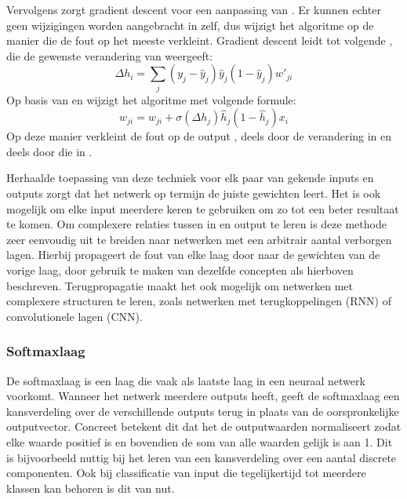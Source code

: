 Vervolgens zorgt gradient descent voor een aanpassing van . Er kunnen echter geen wijzigingen worden aangebracht in  zelf, dus wijzigt het algoritme  op de manier die de fout op  het meeste verkleint. Gradient descent leidt tot volgende , die de gewenste verandering van  weergeeft:
\begin{equation}
    \Delta h_i = \sum\limits_{j}(y_j-\hat{y}_j)\hat{y}_j(1-\hat{y}_j)w'_{ji}
\end{equation}
Op basis van  en  wijzigt het algoritme  met volgende formule:
\begin{equation}
    w_{ji} = w_{ji} + \sigma(\Delta h_j)\hat{h}_j(1-\hat{h}_j)x_i
\end{equation}
Op deze manier verkleint de fout op de output , deels door de verandering in  en deels door die in \cite{Blockeel}.

Herhaalde toepassing van deze techniek voor elk paar van gekende inputs en outputs zorgt dat het netwerk op termijn de juiste gewichten leert. Het is ook mogelijk om elke input meerdere keren te gebruiken om zo tot een beter resultaat te komen. Om complexere relaties tussen in en output te leren is deze methode zeer eenvoudig uit te breiden naar netwerken met een arbitrair aantal verborgen lagen. Hierbij propageert de fout van elke laag door naar de gewichten van de vorige laag, door gebruik te maken van dezelfde concepten als hierboven beschreven. Terugpropagatie maakt het ook mogelijk om netwerken met complexere structuren te leren, zoals netwerken met terugkoppelingen (RNN) of convolutionele lagen (CNN).

\subsubsection{Softmaxlaag}\label{par:softmax}
De softmaxlaag is een laag die vaak als laatste laag in een neuraal netwerk voorkomt. Wanneer het netwerk meerdere outputs heeft, geeft de softmaxlaag een kansverdeling over de verschillende outputs terug in plaats van de oorspronkelijke outputvector. Concreet betekent dit dat het de outputwaarden normaliseert zodat elke waarde positief is en bovendien de som van alle waarden gelijk is aan 1. Dit is bijvoorbeeld nuttig bij het leren van een kansverdeling over een aantal discrete componenten. Ook bij classificatie van input die tegelijkertijd tot meerdere klassen kan behoren is dit van nut.

